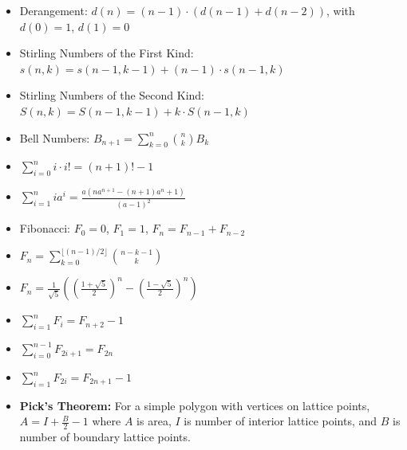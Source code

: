 \begin{itemize}
  \item Derangement: $d(n) = (n-1) \cdot (d(n-1) + d(n-2))$, with $d(0) = 1$, $d(1) = 0$
  \item Stirling Numbers of the First Kind: $s(n,k) = s(n-1,k-1) + (n-1) \cdot s(n-1,k)$
  \item Stirling Numbers of the Second Kind: $S(n,k) = S(n-1,k-1) + k \cdot S(n-1,k)$
  \item Bell Numbers: $B_{n+1} = \sum_{k=0}^{n} \binom{n}{k} B_k$
  \item $\displaystyle \sum_{i=0}^{n} i \cdot i! = (n+1)! - 1$
  \item $\displaystyle \sum_{i=1}^{n} i a^i = \frac{a (n a^{n+1} - (n+1) a^n + 1)}{(a - 1)^2}$
  \item Fibonacci: $F_0 = 0$, $F_1 = 1$, $F_n = F_{n-1} + F_{n-2}$
  \item $\displaystyle F_n = \sum_{k=0}^{\lfloor (n-1)/2 \rfloor} \binom{n-k-1}{k}$
  \item $\displaystyle F_n = \frac{1}{\sqrt{5}} \left( \left( \frac{1+\sqrt{5}}{2} \right)^n - \left( \frac{1-\sqrt{5}}{2} \right)^n \right)$
  \item $\displaystyle \sum_{i=1}^{n} F_i = F_{n+2} - 1$
  \item $\displaystyle \sum_{i=0}^{n-1} F_{2i+1} = F_{2n}$
  \item $\displaystyle \sum_{i=1}^{n} F_{2i} = F_{2n+1} - 1$
  \item \textbf{Pick's Theorem:} For a simple polygon with vertices on lattice points, $A = I + \frac{B}{2} - 1$ where $A$ is area, $I$ is number of interior lattice points, and $B$ is number of boundary lattice points.
\end{itemize}